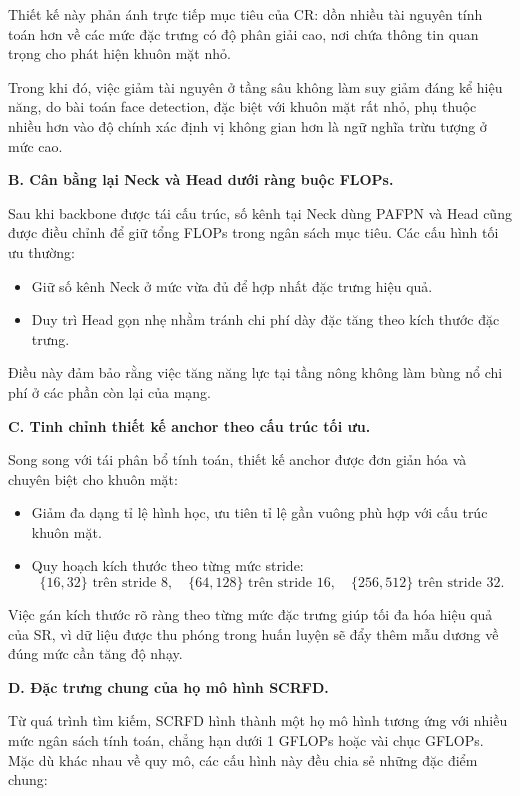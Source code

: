 Thiết kế này phản ánh trực tiếp mục tiêu của CR: dồn nhiều tài nguyên tính toán hơn về các mức đặc trưng có độ phân giải cao, nơi chứa thông tin quan trọng cho phát hiện khuôn mặt nhỏ.

Trong khi đó, việc giảm tài nguyên ở tầng sâu không làm suy giảm đáng kể hiệu năng, do bài toán face detection, đặc biệt với khuôn mặt rất nhỏ, phụ thuộc nhiều hơn vào độ chính xác định vị không gian hơn là ngữ nghĩa trừu tượng ở mức cao.

\medskip
\noindent\textbf{B. Cân bằng lại Neck và Head dưới ràng buộc FLOPs.}

Sau khi backbone được tái cấu trúc, số kênh tại Neck dùng PAFPN và Head cũng được điều chỉnh để giữ tổng FLOPs trong ngân sách mục tiêu. 
Các cấu hình tối ưu thường:

\begin{itemize}
  \item Giữ số kênh Neck ở mức vừa đủ để hợp nhất đặc trưng hiệu quả.
  \item Duy trì Head gọn nhẹ nhằm tránh chi phí dày đặc tăng theo kích thước đặc trưng.
\end{itemize}

Điều này đảm bảo rằng việc tăng năng lực tại tầng nông không làm bùng nổ chi phí ở các phần còn lại của mạng.

\medskip
\noindent\textbf{C. Tinh chỉnh thiết kế anchor theo cấu trúc tối ưu.}

Song song với tái phân bổ tính toán, thiết kế anchor được đơn giản hóa và chuyên biệt cho khuôn mặt:

\begin{itemize}
  \item Giảm đa dạng tỉ lệ hình học, ưu tiên tỉ lệ gần vuông phù hợp với cấu trúc khuôn mặt.
  \item Quy hoạch kích thước theo từng mức stride:
  \[
  \{16,32\} \text{ trên stride } 8,\quad
  \{64,128\} \text{ trên stride } 16,\quad
  \{256,512\} \text{ trên stride } 32.
  \]
\end{itemize}

Việc gán kích thước rõ ràng theo từng mức đặc trưng giúp tối đa hóa hiệu quả của SR, vì dữ liệu được thu phóng trong huấn luyện sẽ đẩy thêm mẫu dương về đúng mức cần tăng độ nhạy.

\medskip
\noindent\textbf{D. Đặc trưng chung của họ mô hình SCRFD.}

Từ quá trình tìm kiếm, SCRFD hình thành một họ mô hình tương ứng với nhiều mức ngân sách tính toán, chẳng hạn dưới 1 GFLOPs hoặc vài chục GFLOPs. 
Mặc dù khác nhau về quy mô, các cấu hình này đều chia sẻ những đặc điểm chung:

